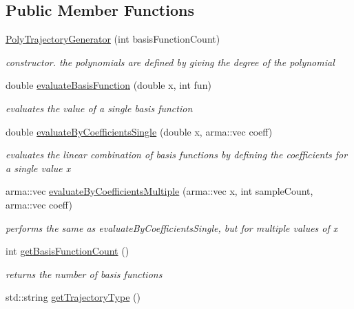 \subsection*{Public Member Functions}
\begin{DoxyCompactItemize}
\item 
\hyperlink{classkukadu_1_1PolyTrajectoryGenerator_aaae3f21fde5c8bef81f3cc9eb365fcfb}{Poly\-Trajectory\-Generator} (int basis\-Function\-Count)
\begin{DoxyCompactList}\small\item\em constructor. the polynomials are defined by giving the degree of the polynomial \end{DoxyCompactList}\item 
double \hyperlink{classkukadu_1_1PolyTrajectoryGenerator_aaad5efdc0b4a8a4e55db0ffcfd7939f7}{evaluate\-Basis\-Function} (double x, int fun)
\begin{DoxyCompactList}\small\item\em evaluates the value of a single basis function \end{DoxyCompactList}\item 
double \hyperlink{classkukadu_1_1PolyTrajectoryGenerator_a3ce8a84b6a838a73708414baf2a688ba}{evaluate\-By\-Coefficients\-Single} (double x, arma\-::vec coeff)
\begin{DoxyCompactList}\small\item\em evaluates the linear combination of basis functions by defining the coefficients for a single value x \end{DoxyCompactList}\item 
arma\-::vec \hyperlink{classkukadu_1_1PolyTrajectoryGenerator_a00a575cf44a1b0061131227baae4f593}{evaluate\-By\-Coefficients\-Multiple} (arma\-::vec x, int sample\-Count, arma\-::vec coeff)
\begin{DoxyCompactList}\small\item\em performs the same as evaluate\-By\-Coefficients\-Single, but for multiple values of x \end{DoxyCompactList}\item 
\hypertarget{classkukadu_1_1PolyTrajectoryGenerator_ae8578365c5ae221c8cf14208b74c8975}{int \hyperlink{classkukadu_1_1PolyTrajectoryGenerator_ae8578365c5ae221c8cf14208b74c8975}{get\-Basis\-Function\-Count} ()}\label{classkukadu_1_1PolyTrajectoryGenerator_ae8578365c5ae221c8cf14208b74c8975}

\begin{DoxyCompactList}\small\item\em returns the number of basis functions \end{DoxyCompactList}\item 
\hypertarget{classkukadu_1_1PolyTrajectoryGenerator_adb937d18031924c54829977211e1d250}{std\-::string \hyperlink{classkukadu_1_1PolyTrajectoryGenerator_adb937d18031924c54829977211e1d250}{get\-Trajectory\-Type} ()}\label{classkukadu_1_1PolyTrajectoryGenerator_adb937d18031924c54829977211e1d250}


\end{DoxyCompactItemize}

